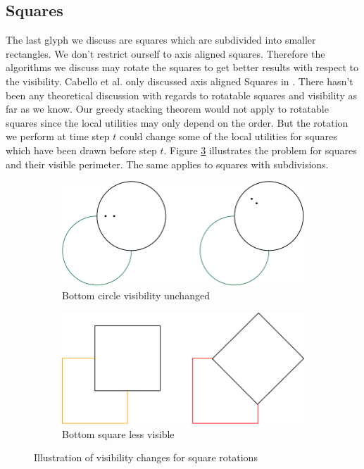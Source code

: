 \documentclass[a4paper,11pt]{article}
\begin{document}
\subsection{Squares}
The last glyph we discuss are squares which are subdivided into smaller rectangles. We don't restrict ourself to axis aligned squares. Therefore the algorithms we discuss may rotate the squares to get better results with respect to the visibility.
Cabello et al. only discussed axis aligned Squares in \cite{cabello}. There hasn't been any theoretical discussion with regards to rotatable squares and visibility as far as we know. Our greedy stacking theorem would not apply to rotatable squares since the local utilities may only depend on the order. But the rotation we perform at time step $t$ could change some of the local utilities for squares which have been drawn before step $t$. Figure \ref{fig:rotation_problems} illustrates the problem for squares and their visible perimeter. The same applies to squares with subdivisions.


\begin{figure}[H]
  \begin{subfigure}{0.5\textwidth}
  \begin{centering}
    \includegraphics[width=0.8\linewidth]{assets/circle_rotation.png}
    \caption{Bottom circle visibility unchanged}\label{fig:circle_rotations}
    \end{centering}
  \end{subfigure}
  \begin{subfigure}{0.5\textwidth}
    \begin{centering}
    \includegraphics[width=0.8\linewidth]{assets/square_rotation.png}
    \caption{Bottom square less visible}\label{fig:square_rotations}
    \end{centering}
  \end{subfigure}
  \caption{Illustration of visibility changes for square rotations}
  \label{fig:rotation_problems}
\end{figure}
\end{document}
